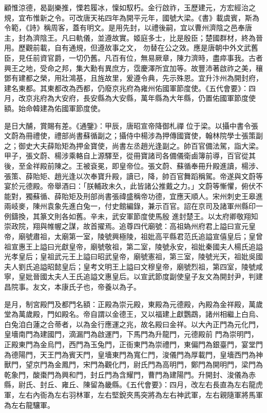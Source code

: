 \begin{pinyinscope}
 顧惟涼德，曷副樂推，慄若履冰，懍如馭朽。金行啟祚，玉歷建元，方宏經治之規，宜布惟新之令。可改唐天祐四年為開平元年，國號大梁。《書》載虞賓，斯為令範，《詩》稱周客，蓋有明文。是用先封，以禮後嗣，宜以曹州濟陰之邑奉唐主，封為濟陰王。凡曰軌儀，並遵故實。姬庭多士，比是殷臣；楚國群材，終為晉用。歷觀前載，自有通規，但遵故事之文，
 勿替在公之效。應是唐朝中外文武舊臣，見任前資官爵，一切仍舊。凡百有位，無易厥章，陳力濟時，盡瘁事我。古者興王之地，受命之邦，集大勳有異庶方，霑慶澤所宜加等。故豐沛著啟祚之美，穰鄧有建都之榮，用壯鴻基，且旌故里，爰遵令典，先示殊恩。宜升汴州為開封府，建名東都。其東都改為西都，仍廢京兆府為雍州佑國軍節度使。《五代會要》：四月，改京兆府為大安府，長安縣為大安縣，萬年縣為大年縣，仍置佑國軍節度使額。始命韓建為佑國軍節度使。



 是日大酺，賞賜有差。《通鑒》：甲辰，唐昭宣帝降御札禪
 位于梁。以攝中書令張文蔚為冊禮使，禮部尚書蘇循副之；攝侍中楊涉為押傳國寶使，翰林院學士張策副之；御史大夫薛貽矩為押金寶使，尚書左丞趙光逢副之。帥百官備法駕，詣大梁。甲子，張文蔚、楊涉乘輅自上源驛至，從冊寶諸司各備儀衛鹵簿前導，百官從其後，至金祥殿前陳之。王被袞冕，即皇帝位。張文蔚、蘇循奉冊升殿進讀，楊涉、張策、薛貽矩、趙光逢以次奉寶升殿，讀已，降，帥百官舞蹈稱駕。帝遂與文蔚等宴於元德殿。帝舉酒曰：「朕輔政未久，此皆諸公推戴之力。」文蔚等慚懼，俯伏不能對，獨蘇循、薛貽矩及刑部尚書張禕盛稱帝功德，宜應天順人。宋州刺史王皋進兩岐麥，陳州袁象先進白兔一，付史館編錄，兼示百官。詔在京司及諸軍州縣印一例鑄換，其篆文則各如舊。辛未，武安軍節度使馬殷
 進封楚王。以太府卿敬翔知崇政院，翔與帷幄之謀，故首擢焉。追尊四代廟號：高祖媯州府君上謚曰宣元皇帝，廟號肅祖，太廟第一室，陵號興極陵，祖妣高平縣君范氏追謚宣僖皇后；皇曾祖宣惠王上謚曰光獻皇帝，廟號敬祖，第二室，陵號永安，祖妣秦國夫人楊氏追謚光孝皇后；皇祖武元王上謚曰昭武皇帝，廟號憲祖，第三室，陵號光天，祖妣吳國夫人劉氏追謚昭懿皇后；皇考文明王上謚曰文穆皇帝，廟號烈祖，第四室，陵號咸
 寧，皇妣晉國太夫人王氏追謚文惠皇后。以宣武節度副使皇子友文為開封尹，判建昌院事。友文，本康氏子也，帝養以為子。



 是月，制宮殿門及都門名額：正殿為崇元殿，東殿為元德殿，內殿為金祥殿，萬歲堂為萬歲殿，門如殿名。帝自謂以金德王，又以福建上獻鸚鵡，諸州相繼上白烏、白兔洎白蓮之合蒂者，以為金行應運之兆，故名殿曰金祥。以大內正門為元化門，皇墻南門為建國門，滴漏門為啟運門，下馬門為升龍門，元德殿前
 門為崇明門，正殿東門為金烏門，西門為玉兔門，正衙東門為崇禮門，東偏門為銀臺門，宴堂門為德陽門，天王門為賓天門，皇墻東門為寬仁門，浚儀門為厚載門，皇墻西門為神獸門，望京門為金鳳門，宋門為觀化門，尉氏門為高明門，鄭門為開明門，梁門為乾象門，酸棗門為興和門，封丘門為含耀門，曹門為建陽門。升開封、浚儀為赤縣，尉氏、封丘、雍丘、陳留為畿縣。《五代會要》：四月，改左右長直為左右龍虎軍，左右內衙為左右羽林軍，左右堅銳夾馬突將為左右神武軍，左右親隨軍將馬軍為左右龍驤軍。




\end{pinyinscope}
